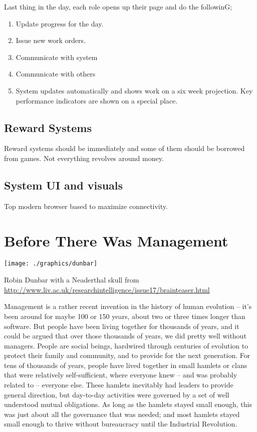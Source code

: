 Last thing in the day, each role opens up their page and do the followinG;

\begin{enumerate}
\item Update progress for the day.
\item Issue new work orders.
\item Communicate with system
\item Communicate with others
\item System updates automatically and shows work on a six week
projection. Key performance indicators are shown on a special place.
\end{enumerate}

\section*{Reward Systems}

Reward systems should be immediately and some of them should be borrowed from games. Not everything revolves around money.


\section*{System UI and visuals}

Top modern browser based to maximize connectivity.

















\chapter{Before There Was Management}
\begin{marginfigure}
\texttt{[image: ./graphics/dunbar]}
\caption{Robin Dunbar with a Neaderthal skull from \url{http://www.liv.ac.uk/researchintelligence/issue17/brainteaser.html}}
\end{marginfigure}

Management is a rather recent invention in the history of human evolution – it’s been around for maybe 100 or 150 years, about two or three times longer than software. But people have been living together for thousands of years, and it could be argued that over those thousands of years, we did pretty well without managers. People are social beings, hardwired through centuries of evolution to protect their family and community, and to provide for the next generation. For tens of thousands of years, people have lived together in small hamlets or clans that were relatively self-sufficient, where everyone knew – and was probably related to – everyone else. These hamlets inevitably had leaders to provide general direction, but day-to-day activities were governed by a set of well understood mutual obligations. As long as the hamlets stayed small enough, this was just about all the governance that was needed; and most hamlets stayed small enough to thrive without bureaucracy until the Industrial Revolution.

